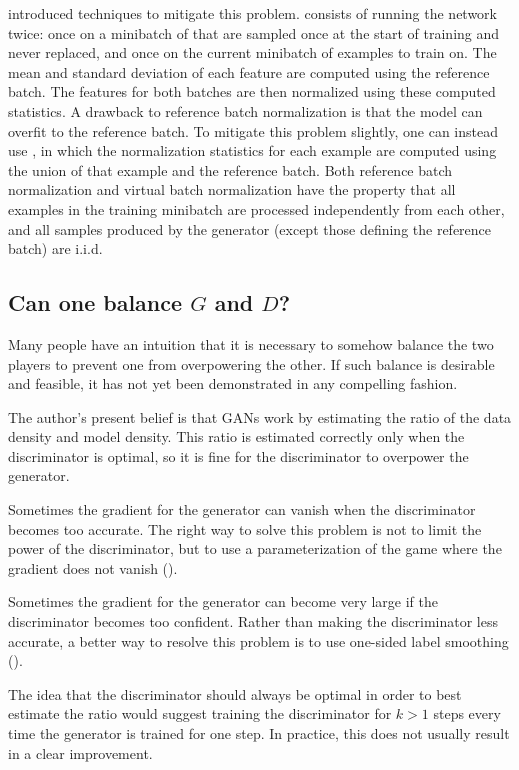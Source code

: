 \citet{Salimans-et-al-arxiv2014} introduced techniques to mitigate this problem.
 consists of running the network twice:
once on a minibatch of  that are sampled once at the
start of training and never replaced, and once on the current minibatch of examples
to train on.
The mean and standard deviation of each feature are computed using the reference
batch. The features for both batches are then normalized using these computed statistics.
A drawback to reference batch normalization is that the model can overfit to the
reference batch. To mitigate this problem slightly, one can instead use
, in which the normalization statistics for each
example are computed using the union of that example and the reference batch.
Both reference batch normalization and virtual batch normalization have the property
that all examples in the training minibatch are processed independently from each other,
and all samples produced by the generator (except those defining the reference batch)
are i.i.d.

\subsection{Can one balance $G$ and $D$?}

Many people have an intuition that it is necessary to somehow balance the two players
to prevent one from overpowering the other.
If such balance is desirable and feasible, it has not yet been demonstrated in any
compelling fashion.

The author's present belief is that GANs work by estimating the ratio of the data density
and model density. This ratio is estimated correctly only when the discriminator is
optimal, so it is fine for the discriminator to overpower the generator.

Sometimes the gradient for the generator can vanish when the discriminator becomes
too accurate.
The right way to solve this problem is not to limit the power of the discriminator,
but to use a parameterization of the game where the gradient does not vanish
().

Sometimes the gradient for the generator can become very large if the discriminator
becomes too confident. Rather than making the discriminator less accurate, a better
way to resolve this problem is to use one-sided label smoothing ().

The idea that the discriminator should always be optimal in order to best estimate
the ratio would suggest training the discriminator for $k > 1$ steps every time
the generator is trained for one step. In practice, this does not usually result in a
clear improvement.

